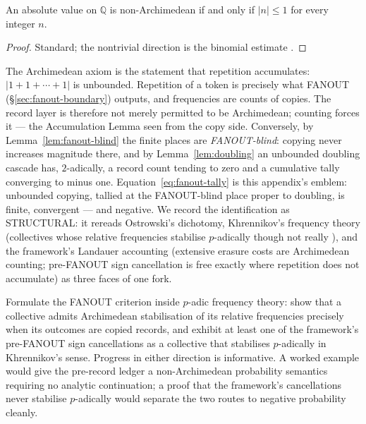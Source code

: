 \begin{lemma}\label{lem:fanout-blind}
An absolute value on $\mathbb{Q}$ is non-Archimedean if and only if $|n| \le 1$ for
every integer $n$.
\end{lemma}

\begin{proof}
Standard; the nontrivial direction is the binomial estimate \autocite{gouvea1997}.
\end{proof}

The Archimedean axiom is the statement that repetition accumulates:
$|1 + 1 + \cdots + 1|$ is unbounded. Repetition of a token is precisely what FANOUT
(\S\ref{sec:fanout-boundary}) outputs, and frequencies are counts of copies. The record
layer is therefore not merely permitted to be Archimedean; counting forces it --- the
Accumulation Lemma seen from the copy side. Conversely, by Lemma~\ref{lem:fanout-blind}
the finite places are \emph{FANOUT-blind}: copying never increases magnitude there, and
by Lemma~\ref{lem:doubling} an unbounded doubling cascade has, $2$-adically, a record
count tending to zero and a cumulative tally converging to minus one.
Equation~\eqref{eq:fanout-tally} is this appendix's emblem: unbounded copying, tallied
at the FANOUT-blind place proper to doubling, is finite, convergent --- and negative.
We record the identification as STRUCTURAL: it rereads Ostrowski's dichotomy,
Khrennikov's frequency theory (collectives whose relative frequencies stabilise
$p$-adically though not really \autocite{khrennikov1995}), and the framework's Landauer
accounting (extensive erasure costs are Archimedean counting; pre-FANOUT sign
cancellation is free exactly where repetition does not accumulate) as three faces of
one fork.

\begin{openproblem}\label{op:padic-frequency}
Formulate the FANOUT criterion inside $p$-adic frequency theory: show that a collective
admits Archimedean stabilisation of its relative frequencies precisely when its
outcomes are copied records, and exhibit at least one of the framework's pre-FANOUT
sign cancellations as a collective that stabilises $p$-adically in Khrennikov's sense.
Progress in either direction is informative. A worked example would give the
pre-record ledger a non-Archimedean probability semantics requiring no analytic
continuation; a proof that the framework's cancellations never stabilise $p$-adically
would separate the two routes to negative probability cleanly.
\end{openproblem}

